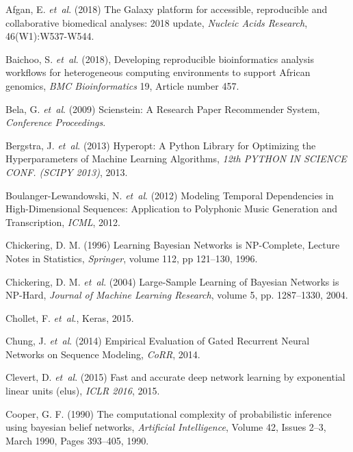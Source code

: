 \documentclass{bioinfo}
\begin{document}
\begin{thebibliography}{}

Afgan, E. {\it et~al}. (2018) The Galaxy platform for accessible, reproducible and collaborative biomedical analyses: 2018 update, {\it Nucleic Acids Research}, 46(W1):W537-W544.

Baichoo, S. {\it et~al}. (2018), Developing reproducible bioinformatics analysis workflows for heterogeneous computing environments to support African genomics, {\it {BMC} Bioinformatics} 19, Article number 457.

Bela, G. {\it et~al}. (2009) Scienstein: A Research Paper Recommender System, {\it Conference Proceedings}.

 Bergstra, J. {\it et~al}. (2013) Hyperopt: A Python Library for Optimizing the Hyperparameters of Machine Learning Algorithms, {\it 12th PYTHON IN SCIENCE CONF. (SCIPY 2013)}, 2013.

 Boulanger-Lewandowski, N. {\it et~al}. (2012) Modeling Temporal Dependencies in High-Dimensional Sequences: Application to Polyphonic Music Generation and Transcription, {\it ICML}, 2012.

Chickering, D. M. (1996) Learning Bayesian Networks is NP-Complete, Lecture Notes in Statistics, {\it Springer}, volume 112, pp 121--130, 1996.

Chickering, D. M. {\it et~al}. (2004) Large-Sample Learning of Bayesian Networks is NP-Hard, {\it Journal of Machine Learning Research}, volume 5, pp. 1287--1330, 2004.

Chollet, F. {\it et~al}., Keras, 2015.

Chung, J. {\it et~al}. (2014) Empirical Evaluation of Gated Recurrent Neural Networks on Sequence Modeling, {\it CoRR}, 2014.

Clevert, D. {\it et~al}. (2015) Fast and accurate deep network learning by exponential linear units (elus), {\it ICLR 2016}, 2015.

Cooper, G. F. (1990) The computational complexity of probabilistic inference using bayesian belief networks, {\it Artificial Intelligence}, Volume 42, Issues 2--3, March 1990, Pages 393--405, 1990.


\end{thebibliography}
\end{document}
